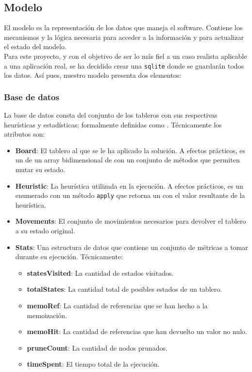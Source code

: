 \subsection{Modelo}

El modelo es la representación de los datos que maneja el software. Contiene los mecanismos y la lógica necesaria para acceder a la información y para actualizar el estado del modelo.\\

Para este proyecto, y con el objetivo de ser lo más fiel a un caso realista aplicable a una aplicación real, se ha decidido crear una \texttt{sqlite} donde se guardarán todos los datos. Así pues, nuestro modelo presenta dos elementos:

\subsubsection{Base de datos}
La base de datos consta del conjunto de los tableros con sus respectivas heurísticas y estadísticas; formalmente definidas como . Técnicamente los atributos son:\\

\begin{itemize}
    \item \textbf{Board}: El tablero al que se le ha aplicado la solución. A efectos prácticos, es un  de un array bidimensional de  con un conjunto de métodos que permiten mutar su estado.
    \item \textbf{Heuristic}: La heurística utilizada en la ejecución. A efectos prácticos, es un enumerado con un método \texttt{apply} que retorna un  con el valor resultante de la heurística.
    \item \textbf{Movements}: El conjunto de movimientos necesarios para devolver el tablero a su estado original.
    \item \textbf{Stats}: Una estructura de datos que contiene un conjunto de métricas a tomar durante su ejecución. Técnicamente: \begin{itemize}
        \item \textbf{statesVisited}: La cantidad de estados visitados.
        \item \textbf{totalStates}: La cantidad total de posibles estados de un tablero.
        \item \textbf{memoRef}: La cantidad de referencias que se han hecho a la memoización.
        \item \textbf{memoHit}: La cantidad de referencias que han devuelto un valor no nulo.
        \item \textbf{pruneCount}: La cantidad de nodos prunados.
        \item \textbf{timeSpent}: El tiempo total de la ejecución.
    \end{itemize}
\end{itemize}

